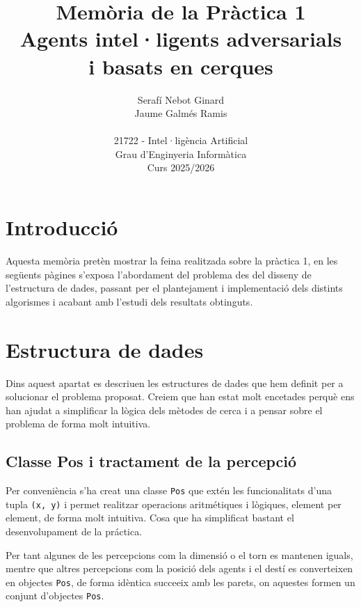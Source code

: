 \documentclass[12pt,a4paper]{report}
\title{
  \vspace{0cm}
  \textbf{Memòria de la Pràctica 1}\\
  {\Large \textbf{Agents intel·ligents adversarials \\[-0.3em] i basats en cerques}}
  \vspace{5cm}
}
\author{Serafí Nebot Ginard \\  Jaume Galmés Ramis \\
\vspace{7cm}
\\ 21722 - Intel·ligència Artificial \\ Grau d’Enginyeria Informàtica \\ Curs 2025/2026
}
\begin{document}
\date{}  %
\maketitle
\thispagestyle{empty}
\newpage
\titlespacing*{\chapter}{0pt}{0pt}{20pt}  

\renewcommand{\contentsname}{Índex}
\tableofcontents
\newpage


\chapter{Introducció}
\label{ch:intro}
Aquesta memòria pretèn mostrar la feina realitzada sobre la pràctica 1, en les següents pàgines s'exposa l'abordament del problema
des del disseny de l'estructura de dades, passant per el plantejament i implementació dels distints algorismes i acabant amb
l'estudi dels resultats obtinguts.

\chapter{Estructura de dades}
\label{ch:structure}
Dins aquest apartat es descriuen les estructures de dades que hem definit per a solucionar el problema proposat.
Creiem que han estat molt encetades perquè ens han ajudat a simplificar la lògica dels mètodes de cerca i a pensar sobre el problema de forma molt intuitiva.

\section{Classe Pos i tractament de la percepció}
Per conveniència s'ha creat una classe \texttt{Pos} que extén les funcionalitats d'una tupla \texttt{(x, y)}
i permet realitzar operacions aritmétiques i lògiques, element per element, de forma molt intuitiva. Cosa que ha simplificat bastant el
desenvolupament de la práctica.

Per tant algunes de les percepcions com la dimensió o el torn es mantenen iguals,
mentre que altres percepcions com la posició dels agents i el destí es converteixen en objectes \texttt{Pos}, de forma
idèntica succeeix amb les parets, on aquestes formen un conjunt d'objectes \texttt{Pos}.
\end{document}
